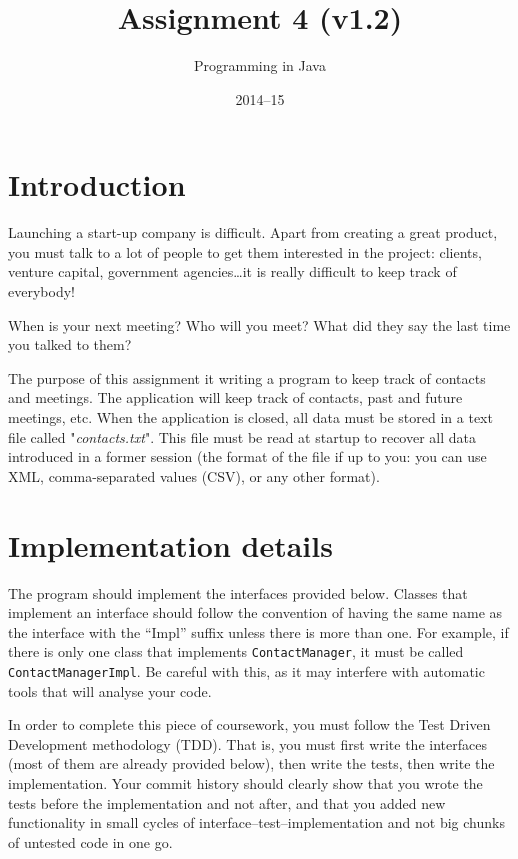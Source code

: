 \documentclass{article}
\author{Programming in Java}
\title{Assignment 4 (v1.2)}
\date{2014--15}
\begin{document}
\maketitle

\section{Introduction}
\label{sec:introduction}

Launching a start-up company is difficult. Apart from creating a great
product, you must talk to a lot of people to get them interested in
the project: clients, venture capital, government agencies\ldots it is
really difficult to keep track of everybody! 

When is your next meeting? Who will you meet? What did they say the
last time you talked to them?

The purpose of this assignment it writing a program to keep track of
contacts and meetings. The application will keep track of contacts,
past and future meetings, etc. When the application is closed, all
data must be stored in a text file called "\emph{contacts.txt}". This
file must be read at startup to recover all data introduced in a
former session (the format of the file if up to you: you can use XML,
comma-separated values (CSV), or any other format).

\section{Implementation details}
\label{sec:impl-deta}

The program should implement the interfaces
provided below. Classes that implement an interface should follow the
convention of having the same
name as the interface with the ``Impl'' suffix unless there is more 
than one. For
example, if there is only one class that implements
\verb+ContactManager+, it must be called \verb+ContactManagerImpl+. Be
careful with this, as it may interfere with automatic tools that will
analyse your code. 

In order to complete this piece of coursework, you must follow the
Test Driven Development methodology (TDD). That is, you must first
write the interfaces (most of them are already provided below), then
write the tests, then write the implementation. Your commit history
should clearly show that you wrote the tests before the implementation
and not after, and that you added new functionality in small cycles of
interface--test--implementation and not big chunks of untested code in
one go. 
\end{document}

